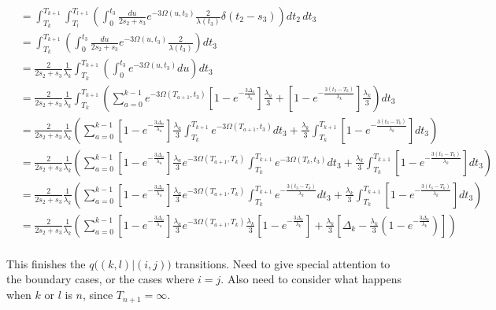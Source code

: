 \documentclass{article}
\begin{document}
\begin{align*}
    &=\int_{T_k}^{T_{k+1}}\int_{T_l}^{T_{l+1}}\left(\int_0^{t_3}\frac{du}{2s_2+s_3}e^{-3\Omega(u,t_3)}\frac{2}{\lambda(t_3)}\delta(t_2-s_3)\right)dt_2\,dt_3\\
    &=\int_{T_k}^{T_{k+1}}\left(\int_0^{t_3}\frac{du}{2s_2+s_3}e^{-3\Omega(u,t_3)}\frac{2}{\lambda(t_3)}\right)dt_3\\
    &=\frac{2}{2s_2+s_3}\frac{1}{\lambda_k}\int_{T_k}^{T_{k+1}}\left(\int_0^{t_3}e^{-3\Omega(u,t_3)}du\right)dt_3\\
    &=\frac{2}{2s_2+s_3}\frac{1}{\lambda_k}\int_{T_k}^{T_{k+1}}\left(
    \sum_{a=0}^{k-1} e^{-3\Omega(T_{a+1},t_3)}
    \left[1-e^{-\frac{3 \Delta_a}{\lambda_a}}\right]\frac{\lambda_a}{3}+
    \left[1-e^{-\frac{3 \left(t_3-T_{k}\right)}{\lambda_{k}}}\right]\frac{\lambda_{k}}{3}\right)
    dt_3\\
    &=\frac{2}{2s_2+s_3}\frac{1}{\lambda_k}\left(
    \sum_{a=0}^{k-1} 
    \left[1-e^{-\frac{3 \Delta_a}{\lambda_a}}\right]\frac{\lambda_a}{3}
    \int_{T_k}^{T_{k+1}}e^{-3\Omega(T_{a+1},t_3)}dt_3+
    \frac{\lambda_{k}}{3}\int_{T_k}^{T_{k+1}}\left[1-e^{-\frac{3 \left(t_3-T_{k}\right)}{\lambda_{k}}}\right]dt_3\right)
    \\
    &=\frac{2}{2s_2+s_3}\frac{1}{\lambda_k}\left(
    \sum_{a=0}^{k-1} 
    \left[1-e^{-\frac{3 \Delta_a}{\lambda_a}}\right]\frac{\lambda_a}{3}
    e^{-3\Omega(T_{a+1},T_k)}\int_{T_k}^{T_{k+1}}e^{-3\Omega(T_k,t_3)}dt_3+
    \frac{\lambda_{k}}{3}\int_{T_k}^{T_{k+1}}\left[1-e^{-\frac{3 \left(t_3-T_{k}\right)}{\lambda_{k}}}\right]dt_3\right)
    \\
    &=\frac{2}{2s_2+s_3}\frac{1}{\lambda_k}\left(
    \sum_{a=0}^{k-1} 
    \left[1-e^{-\frac{3 \Delta_a}{\lambda_a}}\right]\frac{\lambda_a}{3}
    e^{-3\Omega(T_{a+1},T_k)}\int_{T_k}^{T_{k+1}}e^{-\frac{3(t_3-T_k)}{\lambda_k}}dt_3+
    \frac{\lambda_{k}}{3}\int_{T_k}^{T_{k+1}}\left[1-e^{-\frac{3 \left(t_3-T_{k}\right)}{\lambda_{k}}}\right]dt_3\right)
    \\
    &=\frac{2}{2s_2+s_3}\frac{1}{\lambda_k}\left(
    \sum_{a=0}^{k-1} 
    \left[1-e^{-\frac{3 \Delta_a}{\lambda_a}}\right]\frac{\lambda_a}{3}
    e^{-3\Omega(T_{a+1},T_k)}\frac{\lambda_k}{3}\left[1-e^{-\frac{3\Delta_k}{\lambda_k}}\right]+
    \frac{\lambda_{k}}{3}\left[\Delta_k-\frac{\lambda_k}{3}\left(1-e^{-\frac{3\Delta_k}{\lambda_k}}\right)\right]\right)
    \\
\end{align*}

This finishes the $q\big((k,l)|(i,j)\big)$ transitions. Need to give special
attention to the boundary cases, or the cases where $i=j$. Also need to
consider what happens when $k$ or $l$ is $n$, since $T_{n+1} = \infty$.
\end{document}
